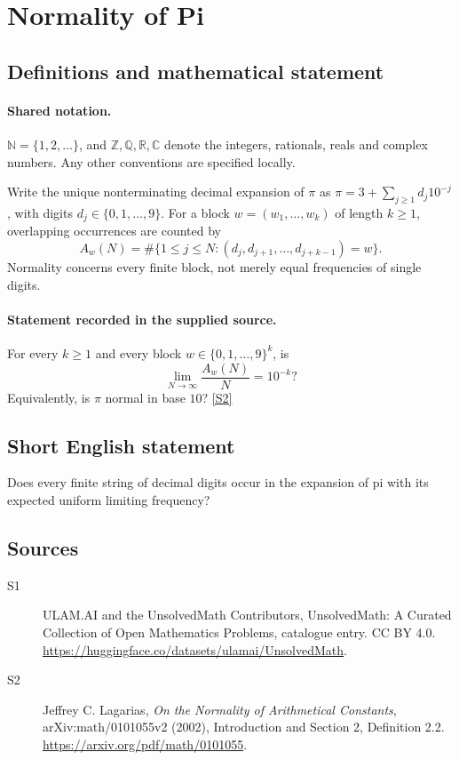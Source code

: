 \documentclass[11pt]{article}
\newcommand{\sref}[2]{\hyperlink{source:#1:#2}{[S#2]}}
\begin{document}
\section{Normality of Pi}\label{statement}

\subsection{Definitions and mathematical statement}

\paragraph{Shared notation.}$\mathbb N=\{1,2,\ldots\}$, and $\mathbb Z,\mathbb Q,\mathbb R,\mathbb C$ denote the integers, rationals, reals and complex numbers. Any other conventions are specified locally.


Write the unique nonterminating decimal expansion of $\pi$ as $\pi=3+\sum_{j\geq1}d_j10^{-j}$, with digits $d_j\in\{0,1,\ldots,9\}$. For a block $w=(w_1,\ldots,w_k)$ of length $k\geq1$, overlapping occurrences are counted by
\[
A_w(N)=\#\{1\leq j\leq N:(d_j,d_{j+1},\ldots,d_{j+k-1})=w\}.
\]
Normality concerns every finite block, not merely equal frequencies of single digits.
\paragraph{Statement recorded in the supplied source.}
For every $k\geq1$ and every block $w\in\{0,1,\ldots,9\}^k$, is
\[
\lim_{N\to\infty}\frac{A_w(N)}N=10^{-k}?
\]
Equivalently, is $\pi$ normal in base $10$? \sref{statement}{2}

\subsection{Short English statement}
Does every finite string of decimal digits occur in the expansion of pi with its expected uniform limiting frequency?
\subsection{Sources}
\begin{description}
\item[\hypertarget{source:statement:1}{S1}] ULAM.AI and the UnsolvedMath Contributors, UnsolvedMath: A Curated Collection of Open Mathematics Problems, catalogue entry. CC BY 4.0. \url{https://huggingface.co/datasets/ulamai/UnsolvedMath}.
\item[\hypertarget{source:statement:2}{S2}] Jeffrey C. Lagarias, \emph{On the Normality of Arithmetical Constants}, arXiv:math/0101055v2 (2002), Introduction and Section 2, Definition 2.2. \url{https://arxiv.org/pdf/math/0101055}.
\end{description}
\label{end:statement}
\end{document}
